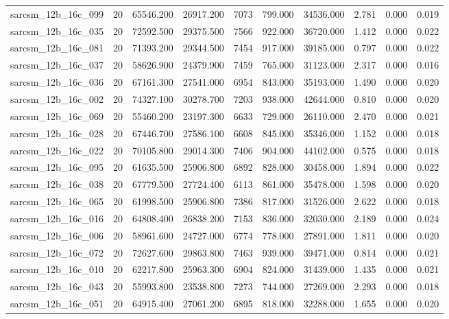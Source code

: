 \begin{tabular}{lrrrrrrrrr}
sarcsm\_12b\_16c\_099 & 20 & 65546.200 & 26917.200 & 7073 & 799.000 & 34536.000 & 2.781 & 0.000 & 0.019 \\
sarcsm\_12b\_16c\_035 & 20 & 72592.500 & 29375.500 & 7566 & 922.000 & 36720.000 & 1.412 & 0.000 & 0.022 \\
sarcsm\_12b\_16c\_081 & 20 & 71393.200 & 29344.500 & 7454 & 917.000 & 39185.000 & 0.797 & 0.000 & 0.022 \\
sarcsm\_12b\_16c\_037 & 20 & 58626.900 & 24379.900 & 7459 & 765.000 & 31123.000 & 2.317 & 0.000 & 0.016 \\
sarcsm\_12b\_16c\_036 & 20 & 67161.300 & 27541.000 & 6954 & 843.000 & 35193.000 & 1.490 & 0.000 & 0.020 \\
sarcsm\_12b\_16c\_002 & 20 & 74327.100 & 30278.700 & 7203 & 938.000 & 42644.000 & 0.810 & 0.000 & 0.020 \\
sarcsm\_12b\_16c\_069 & 20 & 55460.200 & 23197.300 & 6633 & 729.000 & 26110.000 & 2.470 & 0.000 & 0.021 \\
sarcsm\_12b\_16c\_028 & 20 & 67446.700 & 27586.100 & 6608 & 845.000 & 35346.000 & 1.152 & 0.000 & 0.018 \\
sarcsm\_12b\_16c\_022 & 20 & 70105.800 & 29014.300 & 7406 & 904.000 & 44102.000 & 0.575 & 0.000 & 0.018 \\
sarcsm\_12b\_16c\_095 & 20 & 61635.500 & 25906.800 & 6892 & 828.000 & 30458.000 & 1.894 & 0.000 & 0.022 \\
sarcsm\_12b\_16c\_038 & 20 & 67779.500 & 27724.400 & 6113 & 861.000 & 35478.000 & 1.598 & 0.000 & 0.020 \\
sarcsm\_12b\_16c\_065 & 20 & 61998.500 & 25906.800 & 7386 & 817.000 & 31526.000 & 2.622 & 0.000 & 0.018 \\
sarcsm\_12b\_16c\_016 & 20 & 64808.400 & 26838.200 & 7153 & 836.000 & 32030.000 & 2.189 & 0.000 & 0.024 \\
sarcsm\_12b\_16c\_006 & 20 & 58961.600 & 24727.000 & 6774 & 778.000 & 27891.000 & 1.811 & 0.000 & 0.020 \\
sarcsm\_12b\_16c\_072 & 20 & 72627.600 & 29863.800 & 7463 & 939.000 & 39471.000 & 0.814 & 0.000 & 0.021 \\
sarcsm\_12b\_16c\_010 & 20 & 62217.800 & 25963.300 & 6904 & 824.000 & 31439.000 & 1.435 & 0.000 & 0.021 \\
sarcsm\_12b\_16c\_043 & 20 & 55993.800 & 23538.800 & 7273 & 744.000 & 27269.000 & 2.293 & 0.000 & 0.018 \\
sarcsm\_12b\_16c\_051 & 20 & 64915.400 & 27061.200 & 6895 & 818.000 & 32288.000 & 1.655 & 0.000 & 0.020 \\

\end{tabular}
